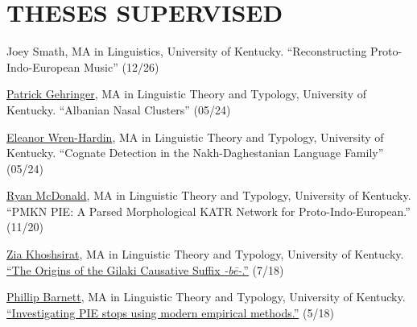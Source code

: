 \documentclass[paper=letter,fontsize=11pt,enabledeprecatedfontcommands]{scrartcl} %
\newcommand{\NewPart}[2]{\section*{\uppercase{#1} #2}}
\newcommand{\TalkEntry}[4]{
		\noindent #1, #2, #3 #4}
\newcommand{\ThesisEntry}[5]{
		\noindent #1 -- #2 #3 ``#4" \textit{#5}}
\begin{document}









\NewPart{Theses Supervised}{}
\begin{etaremune}
\item Joey Smath, MA in Linguistics, University of Kentucky. ``Reconstructing Proto-Indo-European Music'' (12/26)
\item
\href{https://linguistics.as.uky.edu/users/rmc257}{Patrick Gehringer}, MA in Linguistic Theory and Typology, University of Kentucky. ``Albanian Nasal Clusters'' (05/24)
\item \href{https://linguistics.as.uky.edu/users/rmc257}{Eleanor Wren-Hardin}, MA in Linguistic Theory and Typology, University of Kentucky. ``Cognate Detection in the Nakh-Daghestanian Language Family'' (05/24)
\item \href{https://linguistics.as.uky.edu/users/rmc257}{Ryan McDonald}, MA in Linguistic Theory and Typology, University of Kentucky. ``PMKN PIE: A Parsed Morphological KATR Network for Proto-Indo-European.'' (11/20)
\item \href{https://anthro.ucla.edu/grads/zia-khoshsirat}{Zia Khoshsirat}, MA in Linguistic Theory and Typology, University of Kentucky. {\href{https://uknowledge.uky.edu/ltt_etds/30/}{``The Origins of the Gilaki Causative Suffix \textit{-b\={e}-}.''}} (7/18)
\item \href{https://linguistics.ucla.edu/person/phillip-barnett/}{Phillip Barnett}, MA in Linguistic Theory and Typology, University of Kentucky. {\href{https://uknowledge.uky.edu/ltt_etds/28/}{``Investigating PIE stops using modern empirical methods.''}} (5/18)

\end{etaremune}
\end{document}
